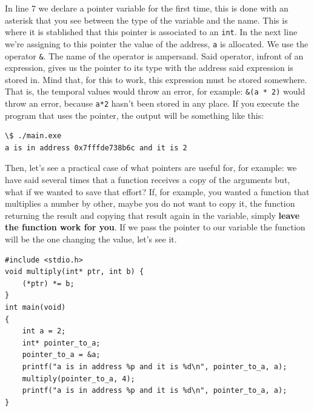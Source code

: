 \documentclass[a4paper]{article}
\begin{document}
In line 7 we declare a pointer variable for the first time, this is done with
an asterisk that you see between the type of the variable and the name. This is
where it is stablished that this pointer is associated to an \texttt{int}. In
the next line we're assigning to this pointer the value of the address,
\verb!a! is allocated. We use the operator \verb!&!. The name of the operator
is ampersand. Said operator, infront of an expression, gives us the pointer to
its type with the address said expression is stored in. Mind that, for this to
work, this expression must be stored somewhere. That is, the temporal values
would throw an error, for example: \verb!&(a * 2)! would throw an error, because
\verb!a*2! hasn't been stored in any place. If you execute the program that uses
the pointer, the output will be something like this:

\noindent
\begin{minipage}[H]{\linewidth}
\mbox{}
\begin{lstlisting}[style=terminalStyle]
\$ ./main.exe
a is in address 0x7fffde738b6c and it is 2
\end{lstlisting}
\end{minipage}

Then, let's see a practical case of what pointers are useful for, for example:
we have said several times that a function receives a copy of the arguments but,
what if we wanted to save that effort? If, for example, you wanted a function
that multiplies a number by other, maybe you do not want to copy it, the
function returning the result and copying that result again in the variable,
simply \textbf{leave the function work for you}. If we pass the pointer to our
variable the function will be the one changing the value, let's see it.

\noindent
\begin{minipage}[H]{\linewidth}
\mbox{}
\begin{lstlisting}[style=C, label={lst:pointers1},
caption={Pointer ussage example}]
#include <stdio.h>
void multiply(int* ptr, int b) {
    (*ptr) *= b;
}
int main(void)
{
    int a = 2;
    int* pointer_to_a;
    pointer_to_a = &a;
    printf("a is in address %p and it is %d\n", pointer_to_a, a);
    multiply(pointer_to_a, 4);
    printf("a is in address %p and it is %d\n", pointer_to_a, a);
}
\end{lstlisting}
\end{minipage}
\end{document}

